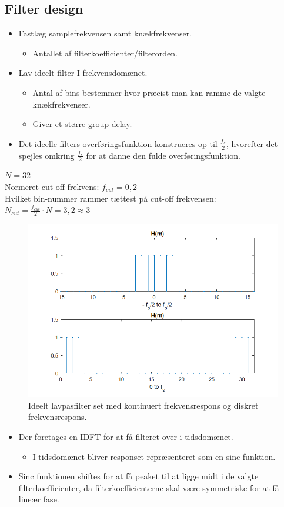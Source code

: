\documentclass[danish]{article}
\begin{document}
\subsection{Filter design}
\begin{itemize}
	\item Fastlæg samplefrekvensen samt knækfrekvenser.
	\begin{itemize}
		\item Antallet af filterkoefficienter/filterorden.
	\end{itemize}
	\item Lav ideelt filter I frekvensdomænet.
	\begin{itemize}
		\item Antal af bins bestemmer hvor præcist man kan ramme de valgte knækfrekvenser.
		\item Giver et større group delay. 
	\end{itemize}
	\item Det ideelle filters overføringsfunktion konstrueres op til $\frac{f_s}{2}$, hvorefter det spejles omkring $\frac{f_s}{2}$ for at danne den fulde overføringsfunktion. 
\end{itemize}

$N = 32$\\
\newline Normeret cut-off frekvens: $f_{cut} = 0,2$\\
\newline Hvilket bin-nummer rammer tættest på cut-off frekvensen: $N_{cut} = \frac{f_{cut}}{2}\cdot N = 3,2 \approx 3$\\

\begin{figure}[H]
	\centering
	\includegraphics[width=0.6\linewidth]{graphics/windowmethod_1}
	\caption{Ideelt lavpasfilter set med kontinuert frekvensrespons og diskret frekvensrespons.}
	\label{fig:windowmethod_1}
\end{figure}

\begin{itemize}
	\item Der foretages en IDFT for at få filteret over i tidsdomænet.
	\begin{itemize}
		\item I tidsdomænet bliver responset repræsenteret som en sinc-funktion.
	\end{itemize}
	\item Sinc funktionen shiftes for at få peaket til at ligge midt i de valgte filterkoefficienter, da filterkoefficienterne skal være symmetriske for at få lineær fase.
\end{itemize}
\end{document}
